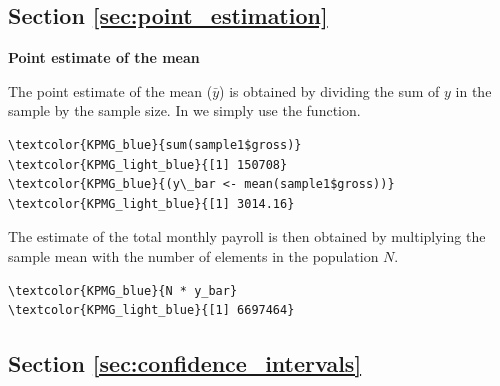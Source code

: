 \subsection{Section \ref{sec:point_estimation}}

\begin{exercise}
\label{ex:point_estimate_mean}

\textbf{Point estimate of the mean} 

The point estimate of the mean ($\bar{y}$) is obtained by dividing the sum of $y$ in the sample by the sample size. In  we simply use the  function.

\begin{Verbatim}[commandchars=\\\{\}]
\textcolor{KPMG_blue}{sum(sample1$gross)}
\textcolor{KPMG_light_blue}{[1] 150708}
\textcolor{KPMG_blue}{(y\_bar <- mean(sample1$gross))}
\textcolor{KPMG_light_blue}{[1] 3014.16}
\end{Verbatim}

The estimate of the total monthly payroll is then obtained by multiplying the sample mean with the number of elements in the population $N$.

\begin{Verbatim}[commandchars=\\\{\}]
\textcolor{KPMG_blue}{N * y_bar}
\textcolor{KPMG_light_blue}{[1] 6697464}
\end{Verbatim}

\end{exercise}

\subsection{Section \ref{sec:confidence_intervals}}


